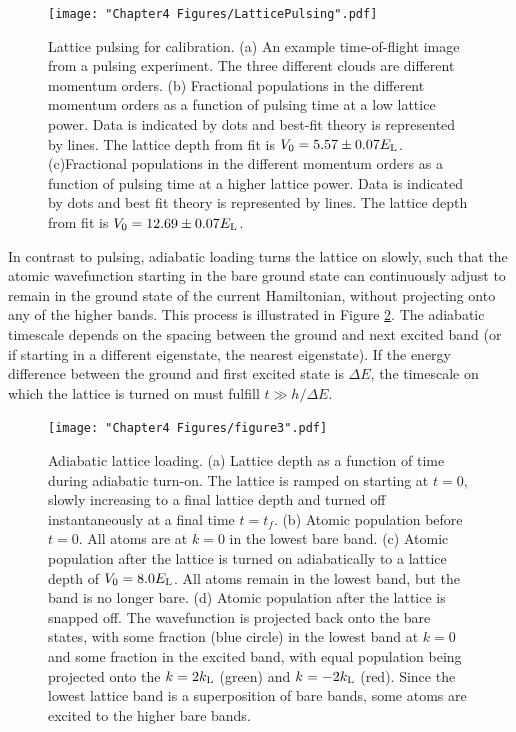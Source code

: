 \begin{figure}
	\texttt{[image: "Chapter4 Figures/LatticePulsing".pdf]}
\caption[Lattice pulsing for calibration]{Lattice pulsing for calibration. (a) An example time-of-flight image from a pulsing experiment. The three different clouds are different momentum orders. (b) Fractional populations in the different momentum orders as a function of pulsing time at a low lattice power. Data is indicated by dots and best-fit theory is represented by lines. The lattice depth from fit is $V_0=5.57\pm0.07 E_{\rm L}$. (c)Fractional populations in the different momentum orders as a function of pulsing time at a higher lattice power. Data is indicated by dots and best fit theory is represented by lines. The lattice depth from fit is $V_0=12.69\pm0.07 E_{\rm L}$. }
\label{fig:latticePulsing}
\end{figure}

In contrast to pulsing, adiabatic loading turns the lattice on slowly, such that the atomic wavefunction starting in the bare ground state can continuously adjust to remain in the ground state of the current Hamiltonian, without projecting onto any of the higher bands. This process is illustrated in Figure \ref{fig:pulsingSchematic}. The adiabatic timescale depends on the spacing between the ground and next excited band (or if starting in a different eigenstate, the nearest eigenstate). If the energy difference between the ground and first excited state is $\Delta E$, the timescale on which the lattice is turned on must fulfill $t \gg h/\Delta E$.  

\begin{figure}
\texttt{[image: "Chapter4 Figures/figure3".pdf]}
\caption[Adiabatic lattice loading]{Adiabatic lattice loading. (a) Lattice depth as a function of time during adiabatic turn-on. The lattice is ramped on starting at $t=0$, slowly increasing to a final lattice depth and turned off instantaneously at a final time $t=t_f$. (b) Atomic population before $t=0$. All atoms are at $k=0$ in the lowest bare band. (c) Atomic population after the lattice is turned on adiabatically to a lattice depth of $V_0 = 8.0 E_{\rm L}$. All atoms remain in the lowest band, but the band is no longer bare. (d) Atomic population after the lattice is snapped off. The wavefunction is projected back onto the bare states, with some fraction (blue circle) in the lowest band at $k=0$ and some fraction in the excited band, with equal population being projected onto the $k = 2 k_{\rm L}$ (green) and $k=-2k_{\rm L}$ (red). Since the lowest lattice band is a superposition of bare bands, some atoms are excited to the higher bare bands. }
\label{fig:pulsingSchematic}
\end{figure}


